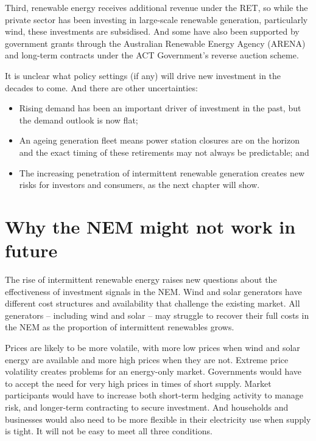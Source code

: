 \documentclass[FrontPage]{grattan}
\begin{document}
Third, renewable energy receives additional revenue under the RET, so while the private sector has been investing in large-scale renewable generation, particularly wind, these investments are subsidised. And some have also been supported by government grants through the Australian Renewable Energy Agency (ARENA) and long-term contracts under the ACT Government's reverse auction scheme.

It is unclear what policy settings (if any) will drive new investment in the decades to come. And there are other uncertainties:
\begin{itemize}
    \item Rising demand has been an important driver of investment in the past, but the demand outlook is now flat;
    \item An ageing generation fleet means power station closures are on the horizon and the exact timing of these retirements may not always be predictable; and
    \item The increasing penetration of intermittent renewable generation creates new risks for investors and consumers, as the next chapter will show.
\end{itemize}



\chapter{Why the NEM might not work in future }\label{chap:why-the-NEM-might-not-work-in-future}
The rise of intermittent renewable energy raises new questions about the effectiveness of investment signals in the NEM\@. Wind and solar generators have different cost structures and availability that challenge the existing market. All generators -- including wind and solar -- may struggle to recover their full costs in the NEM as the proportion of intermittent renewables grows.

Prices are likely to be more volatile, with more low prices when wind and solar energy are available and more high prices when they are not. Extreme price volatility creates problems for an energy-only market. Governments would have to accept the need for very high prices in times of short supply. Market participants would have to increase both short-term hedging activity to manage risk, and longer-term contracting to secure investment. And households and businesses would also need to be more flexible in their electricity use when supply is tight. It will not be easy to meet all three conditions.
\end{document}
